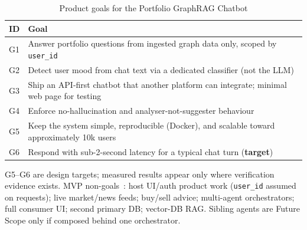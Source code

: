 \begin{table}[!htbp]
\centering
\small
\caption{Product goals for the Portfolio GraphRAG Chatbot}
\label{tab:goals-g1-g6}
\begin{tabularx}{\textwidth}{@{}
  >{\centering\arraybackslash}p{}
  >{\raggedright\arraybackslash}X
  @{}}
\toprule
\textbf{ID} & \textbf{Goal} \\
\midrule
G1 & Answer portfolio questions from ingested graph data only, scoped by \texttt{user\_id} \\
\addlinespace
G2 & Detect user mood from chat text via a dedicated classifier (not the LLM) \\
\addlinespace
G3 & Ship an API-first chatbot that another platform can integrate; minimal web page for testing \\
\addlinespace
G4 & Enforce no-hallucination and analyser-not-suggester behaviour \\
\addlinespace
G5 & Keep the system simple, reproducible (Docker), and scalable toward approximately 10k users \\
\addlinespace
G6 & Respond with sub-2-second latency for a typical chat turn (\textbf{target}) \\
\bottomrule
\end{tabularx}
\end{table}

\noindent
G5--G6 are design targets; measured results appear only where verification evidence exists. MVP non-goals~\cite{prd}: host UI/auth product work (\texttt{user\_id} assumed on requests); live market/news feeds; buy/sell advice; multi-agent orchestrators; full consumer UI; second primary DB; vector-DB RAG. Sibling agents are Future Scope only if composed behind one orchestrator.

